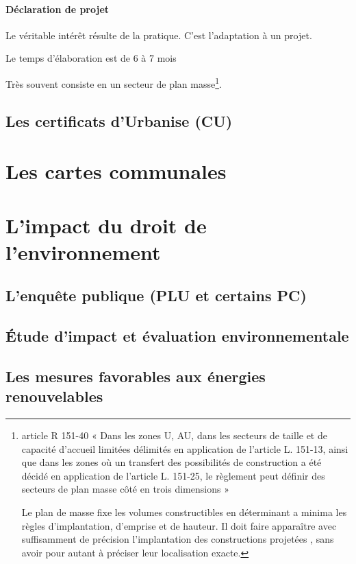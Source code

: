 		 		\paragraph{Déclaration de projet}
		 		
		 		Le véritable intérêt résulte de la pratique. C'est l'adaptation à un projet.
		 		
		 		Le temps d'élaboration est de 6 à 7 mois 
		 		
		 		Très souvent consiste en un secteur de plan masse\footnote{
		 			article R 151-40 « Dans les zones U, AU,
		 			dans les secteurs de taille et de capacité d'accueil limitées délimités en application de
		 			l'article L. 151-13, ainsi que dans les zones où un transfert des possibilités de construction a
		 			été décidé en application de l'article L. 151-25, le règlement peut définir des secteurs de plan
		 			masse côté en trois dimensions »
		 		
			 		Le plan de masse fixe les volumes constructibles en déterminant a minima les règles
			 		d’implantation, d’emprise et de hauteur. Il doit faire apparaître avec suffisamment de
			 		précision l’implantation des constructions projetées
			 		, sans avoir pour autant à préciser leur
			 		localisation exacte.
		 		}.
			
	\subsection{Les certificats d'Urbanise (CU)}
	
\section{Les cartes communales}

\section{L'impact du droit de l'environnement}
	
	\subsection{L'enquête publique (PLU et certains PC)}
	
	\subsection{Étude d'impact et évaluation environnementale}
	
	\subsection{Les mesures favorables aux énergies renouvelables}